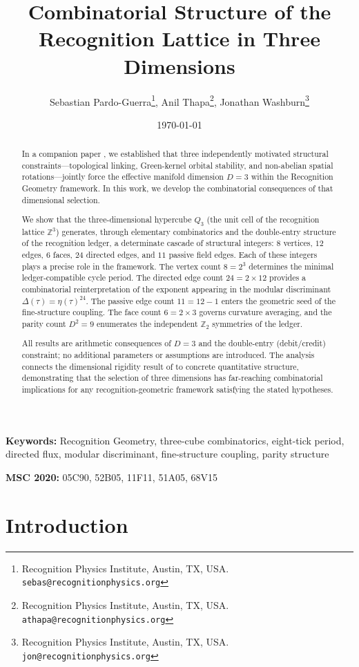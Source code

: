 \documentclass[11pt]{article}
\title{Combinatorial Structure of the Recognition Lattice in Three Dimensions}
\author{
 Sebastian Pardo-Guerra\thanks{Recognition Physics Institute, Austin, TX, USA. \texttt{sebas@recognitionphysics.org}},
 Anil Thapa\thanks{Recognition Physics Institute, Austin, TX, USA. \texttt{athapa@recognitionphysics.org}},
 Jonathan Washburn\thanks{Recognition Physics Institute, Austin, TX, USA. \texttt{jon@recognitionphysics.org}}
}
\date{\today}
\newcommand{\Z}{\mathbb{Z}}
\begin{document}
\maketitle

\begin{abstract}
In a companion paper \cite{PardoGuerraThapa2026}, we established that three independently motivated structural constraints---topological linking, Green-kernel orbital stability, and non-abelian spatial rotations---jointly force the effective manifold dimension $D=3$ within the Recognition Geometry framework.
In this work, we develop the combinatorial consequences of that dimensional selection.

We show that the three-dimensional hypercube $Q_3$ (the unit cell of the recognition lattice $\Z^3$) generates, through elementary combinatorics and the double-entry structure of the recognition ledger, a determinate cascade of structural integers: $8$ vertices, $12$ edges, $6$ faces, $24$ directed edges, and $11$ passive field edges.
Each of these integers plays a precise role in the framework.
The vertex count $8 = 2^3$ determines the minimal ledger-compatible cycle period.
The directed edge count $24 = 2 \times 12$ provides a combinatorial reinterpretation of the exponent appearing in the modular discriminant $\Delta(\tau) = \eta(\tau)^{24}$.
The passive edge count $11 = 12 - 1$ enters the geometric seed of the fine-structure coupling.
The face count $6 = 2 \times 3$ governs curvature averaging, and the parity count $D^2 = 9$ enumerates the independent $\Z_2$ symmetries of the ledger.

All results are arithmetic consequences of $D = 3$ and the double-entry (debit/credit) constraint; no additional parameters or assumptions are introduced.
The analysis connects the dimensional rigidity result of \cite{PardoGuerraThapa2026} to concrete quantitative structure, demonstrating that the selection of three dimensions has far-reaching combinatorial implications for any recognition-geometric framework satisfying the stated hypotheses.
\end{abstract}

\noindent\textbf{Keywords:} Recognition Geometry, three-cube combinatorics, eight-tick period, directed flux, modular discriminant, fine-structure coupling, parity structure

\noindent\textbf{MSC 2020:} 05C90, 52B05, 11F11, 51A05, 68V15

\section{Introduction}
\label{sec:intro}
\end{document}
